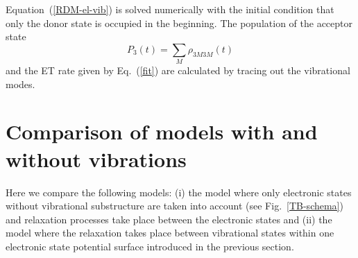 \documentclass[12pt,twoside,a4paper]{report}
\begin{document}
Equation~(\ref{RDM-el-vib}) is solved numerically with the initial condition that only the
donor state is occupied in the beginning.
The population of the acceptor state
\begin{equation}
P_3(t)
         =
              \sum \limits_M 
                  \rho_{3M3M}(t)
\end{equation}
and the ET rate given by Eq.~(\ref{fit})
are calculated by tracing out the vibrational modes.

\section{Comparison of models with and without vibrations}\label{TB-model}
Here we compare the following models:
(i) the model where 
only electronic states without  vibrational
substructure are taken into account (see Fig.~\ref{TB-schema}) and
relaxation processes
take place between the electronic states and 
(ii) the model where the relaxation takes place
between vibrational
states within one electronic state potential surface
introduced in the previous section.
\end{document}
